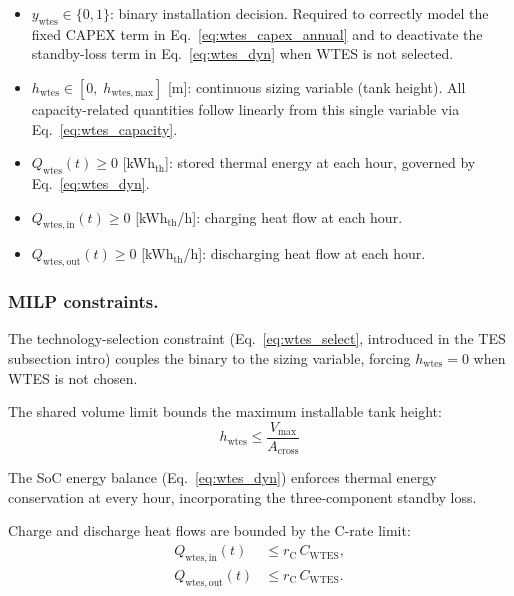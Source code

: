 \documentclass[11pt,a4paper]{report}
\begin{document}
\begin{itemize}

    \item $y_\mathrm{wtes} \in \{0,1\}$: binary installation decision.
          Required to correctly model the fixed CAPEX term in
          Eq.~\eqref{eq:wtes_capex_annual} and to deactivate the standby-loss
          term in Eq.~\eqref{eq:wtes_dyn} when WTES is not selected.

    \item $h_\mathrm{wtes} \in [0,\; h_\mathrm{wtes,max}]$ [m]: continuous
          sizing variable (tank height).
          All capacity-related quantities follow linearly from this single variable
          via Eq.~\eqref{eq:wtes_capacity}.

    \item $Q_\mathrm{wtes}(t) \geq 0$ [kWh$_\mathrm{th}$]: stored thermal energy
          at each hour, governed by Eq.~\eqref{eq:wtes_dyn}.

    \item $Q_\mathrm{wtes,in}(t) \geq 0$ [kWh$_\mathrm{th}$/h]: charging heat
          flow at each hour.

    \item $Q_\mathrm{wtes,out}(t) \geq 0$ [kWh$_\mathrm{th}$/h]: discharging
          heat flow at each hour.

\end{itemize}

\subsubsection{MILP constraints.}

The technology-selection constraint (Eq.~\eqref{eq:wtes_select}, introduced in
the TES subsection intro) couples the binary to the sizing variable, forcing
$h_\mathrm{wtes} = 0$ when WTES is not chosen.

The shared volume limit bounds the maximum installable tank height:
\begin{equation}
    h_\mathrm{wtes} \leq \frac{V_\mathrm{max}}{A_\mathrm{cross}} 
    \label{eq:wtes_hmax}
\end{equation}

The SoC energy balance (Eq.~\eqref{eq:wtes_dyn}) enforces thermal energy
conservation at every hour, incorporating the three-component standby loss.

Charge and discharge heat flows are bounded by the C-rate limit:
\begin{align}
    Q_\mathrm{wtes,in}(t)  &\leq r_\mathrm{C}\,C_\mathrm{WTES}, \label{eq:wtes_ch} \\
    Q_\mathrm{wtes,out}(t) &\leq r_\mathrm{C}\,C_\mathrm{WTES}. \label{eq:wtes_dis}
\end{align}
\end{document}
